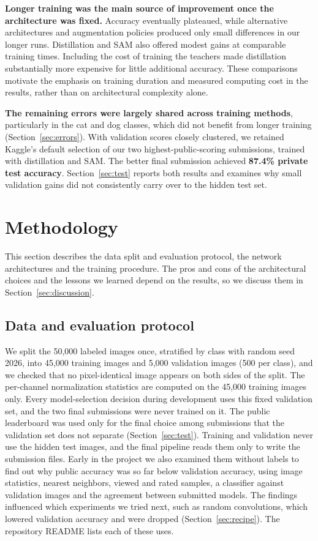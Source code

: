 \documentclass[letterpaper]{article}
\begin{document}
\textbf{Longer training was the main source of improvement once the architecture was fixed.} Accuracy eventually
plateaued, while alternative architectures and augmentation policies produced only small differences in our longer runs.
Distillation and SAM also offered modest gains at comparable training times. Including the cost of training the teachers
made distillation substantially more expensive for little additional accuracy. These comparisons motivate the emphasis on
training duration and measured computing cost in the results, rather than on architectural complexity alone.

\textbf{The remaining errors were largely shared across training methods}, particularly in the cat and dog classes,
which did not benefit from longer training (Section~\ref{sec:errors}). With validation scores closely clustered, we retained
Kaggle's default selection of our two highest-public-scoring submissions, trained with distillation and SAM. The better
final submission achieved \textbf{87.4\% private test accuracy}. Section~\ref{sec:test} reports both results and examines why
small validation gains did not consistently carry over to the hidden test set.

\section{Methodology}
This section describes the data split and evaluation protocol, the network architectures and the training procedure. The pros and cons of the architectural choices and the lessons we learned depend on the results, so we discuss them in Section~\ref{sec:discussion}.

\subsection{Data and evaluation protocol}
We split the 50,000 labeled images once, stratified by class with random seed 2026, into 45,000 training images and 5,000
validation images (500 per class), and we checked that no pixel-identical image appears on both sides of the split. The
per-channel normalization statistics are computed on the 45,000 training images only. Every model-selection decision during
development uses this fixed validation set, and the two final submissions were never trained on it. The public leaderboard was
used only for the final choice among submissions that the validation set does not separate (Section~\ref{sec:test}). Training and validation never use the hidden test images, and the final pipeline reads them only to write the submission
files. Early in the project we also examined them without labels to find out why public accuracy was so far below validation
accuracy, using image statistics, nearest neighbors, viewed and rated samples, a classifier against validation images and the
agreement between submitted models. The findings influenced which experiments we tried next, such as random convolutions, which
lowered validation accuracy and were dropped
(Section~\ref{sec:recipe}). The repository README lists each of these uses.
\end{document}
